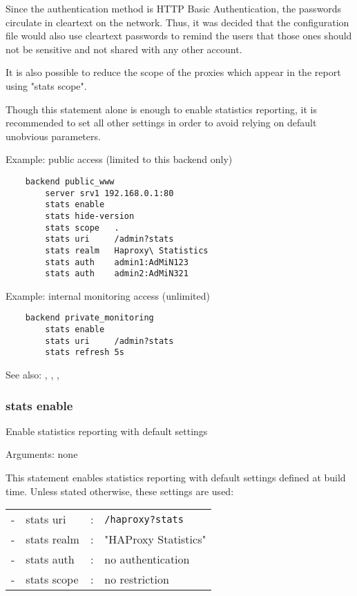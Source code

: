   Since the authentication method is HTTP Basic Authentication, the passwords
  circulate in cleartext on the network. Thus, it was decided that the
  configuration file would also use cleartext passwords to remind the users
  that those ones should not be sensitive and not shared with any other account.

  It is also possible to reduce the scope of the proxies which appear in the
  report using "stats scope".

  Though this statement alone is enough to enable statistics reporting, it is
  recommended to set all other settings in order to avoid relying on default
  unobvious parameters.

  Example: public access (limited to this backend only)
  \begin{verbatim}
    backend public_www
        server srv1 192.168.0.1:80
        stats enable
        stats hide-version
        stats scope   .
        stats uri     /admin?stats
        stats realm   Haproxy\ Statistics
        stats auth    admin1:AdMiN123
        stats auth    admin2:AdMiN321
   \end{verbatim}

   Example: internal monitoring access (unlimited)
   \begin{verbatim}
    backend private_monitoring
        stats enable
        stats uri     /admin?stats
        stats refresh 5s
   \end{verbatim}

  See also: , , , 

\subsubsection[stats enable]{stats enable}


  Enable statistics reporting with default settings


  Arguments: none

  This statement enables statistics reporting with default settings defined
  at build time. Unless stated otherwise, these settings are used:
  
  \begin{tabular}{llll}
  - & stats uri   & : & \verb|/haproxy?stats| \\
  - & stats realm & : & "HAProxy Statistics" \\
  - & stats auth  & : & no authentication \\
  - & stats scope & : & no restriction \\
  \end{tabular}

